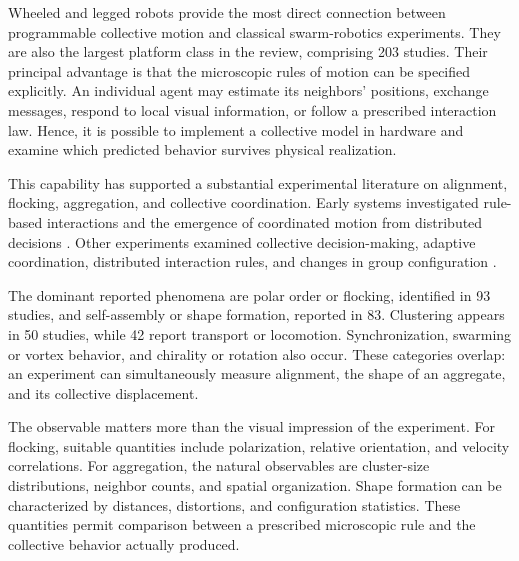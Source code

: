 Wheeled and legged robots provide the most direct connection
between programmable collective motion and classical
swarm-robotics experiments. They are also the largest
platform class in the review, comprising 203 studies.
Their principal advantage is that the microscopic rules
of motion can be specified explicitly. An individual
agent may estimate its neighbors' positions, exchange
messages, respond to local visual information, or follow
a prescribed interaction law. Hence, it is possible to
implement a collective model in hardware and examine
which predicted behavior survives physical realization.

This capability has supported a substantial experimental
literature on alignment, flocking, aggregation, and
collective coordination. Early systems investigated
rule-based interactions and the emergence of coordinated
motion from distributed decisions
\cite{Garnier2005aggregationbehaviou,Turgut2008modelingphasetrans,Turgut2008selforganizedflocka,Navarro2008anapproachtoflock,Miki2010asimplerulebased,Yamada2011circularmotiongene,Ercan2011swarmrobotflocking,Chen2013aflockingalgorithm,Arvin2014comparisonofdiffer,Linevich2016robophysicalstudyo}.
Other experiments examined collective decision-making,
adaptive coordination, distributed interaction rules,
and changes in group configuration
\cite{Cianci2007communicationinas,Christensen2008swarmorphscripta,Parker2010collectiveunarydec,Kernbach2011threecasesofconne,Ferrante2013aselfadaptivecomm,Valentini2015collectivedecision,Li2016turinglearningam,Bonnet2018closedloopinteract,Gaget2020branchedstructuref,Cambier2021culturalevolutiono}.

The dominant reported phenomena are polar order or flocking,
identified in 93 studies, and self-assembly or shape formation,
reported in 83. Clustering appears in 50 studies, while
42 report transport or locomotion. Synchronization, swarming
or vortex behavior, and chirality or rotation also occur.
These categories overlap: an experiment can simultaneously
measure alignment, the shape of an aggregate, and its
collective displacement.

The observable matters more than the visual impression
of the experiment. For flocking, suitable quantities
include polarization, relative orientation, and
velocity correlations. For aggregation, the natural
observables are cluster-size distributions, neighbor
counts, and spatial organization. Shape formation can
be characterized by distances, distortions, and
configuration statistics. These quantities permit
comparison between a prescribed microscopic rule and
the collective behavior actually produced.

